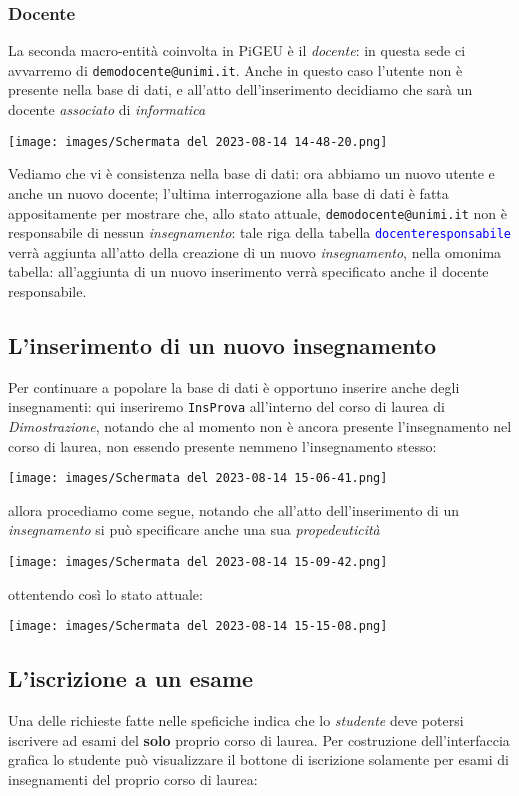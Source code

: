 \documentclass{article}
\newcommand{\tabb}[1]{\texttt{\textcolor{blue}{#1}}}
\newcommand{\und}[0]{\textunderscore}
\begin{document}
\subsubsection{Docente}
La seconda macro-entità coinvolta in PiGEU è il \textit{docente}: in questa sede ci avvarremo di \texttt{demo\und docente@unimi.it}. Anche in questo caso l'utente non è presente nella base di dati, e all'atto dell'inserimento decidiamo che sarà un docente \textit{associato} di \textit{informatica}

\texttt{[image: images/Schermata del 2023-08-14 14-48-20.png]}

Vediamo che vi è consistenza nella base di dati: ora abbiamo un nuovo utente e anche un nuovo docente; l'ultima interrogazione alla base di dati è fatta appositamente per mostrare che, allo stato attuale, \texttt{demo\und docente@unimi.it} non è responsabile di nessun \textit{insegnamento}: tale riga della tabella \tabb{docente\und responsabile} verrà aggiunta all'atto della creazione di un nuovo \textit{insegnamento}, nella omonima tabella: all'aggiunta di un nuovo inserimento verrà specificato anche il docente responsabile.

\subsection{L'inserimento di un nuovo insegnamento}
Per continuare a popolare la base di dati è opportuno inserire anche degli insegnamenti: qui inseriremo \texttt{InsProva} all'interno del corso di laurea di \textit{Dimostrazione}, notando che al momento non è ancora presente l'insegnamento nel corso di laurea, non essendo presente nemmeno l'insegnamento stesso:

\texttt{[image: images/Schermata del 2023-08-14 15-06-41.png]}

allora procediamo come segue, notando che all'atto dell'inserimento di un \textit{insegnamento} si può specificare anche una sua \textit{propedeuticità}

\texttt{[image: images/Schermata del 2023-08-14 15-09-42.png]}

ottentendo così lo stato attuale:

\texttt{[image: images/Schermata del 2023-08-14 15-15-08.png]}

\subsection{L'iscrizione a un esame}
Una delle richieste fatte nelle speficiche indica che lo \textit{studente} deve potersi iscrivere ad esami del \textbf{solo} proprio corso di laurea. Per costruzione dell'interfaccia grafica lo studente può visualizzare il bottone di iscrizione solamente per esami di insegnamenti del proprio corso di laurea:
\end{document}
